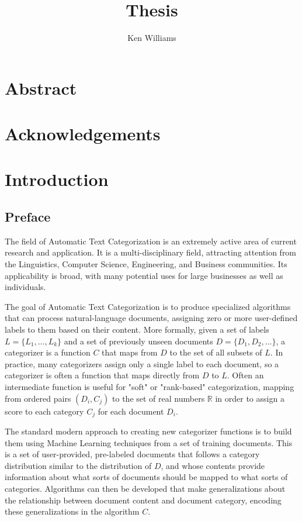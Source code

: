 \documentclass[a4paper]{report}
\title{Thesis}
\author{Ken Williams}
\begin{document}
\newcommand{\method}[1]{\texttt{#1()}}
\newcommand{\class}[1]{\texttt{#1}}

\maketitle

\chapter*{Abstract}
\chapter*{Acknowledgements}

\tableofcontents

\chapter{Introduction}

\section{Preface}

The field of Automatic Text Categorization is an extremely active area
of current research and application.  It is a multi-disciplinary
field, attracting attention from the Linguistics, Computer Science,
Engineering, and Business communities.  Its applicability is broad,
with many potential uses for large businesses as well as individuals.

The goal of Automatic Text Categorization is to produce specialized
algorithms that can process natural-language documents, assigning zero
or more user-defined labels to them based on their content.  More
formally, given a set of labels $L = \{L_1, \ldots, L_k\}$ and a set of
previously unseen documents $D = \{D_1, D_2, \ldots \}$, a categorizer is a
function $C$ that maps from $D$ to the set of all subsets of $L$.  In
practice, many categorizers assign only a single label to each
document, so a categorizer is often a function that maps directly from
$D$ to $L$.  Often an intermediate function is useful for "soft" or 
"rank-based" categorization, mapping from ordered pairs $(D_i, C_j)$ 
to the set of real numbers $\mathbb{R}$ in order to assign a score 
to each category $C_j$ for each document $D_i$.

The standard modern approach to creating new categorizer functions is
to build them using Machine Learning techniques from a set of training
documents.  This is a set of user-provided, pre-labeled documents that
follows a category
distribution similar to the distribution of $D$, and whose contents
provide information about what sorts of documents should be mapped to
what sorts of categories.  Algorithms can then be developed that make
generalizations about the relationship between document content and
document category, encoding these generalizations in the algorithm $C$.
\end{document}
